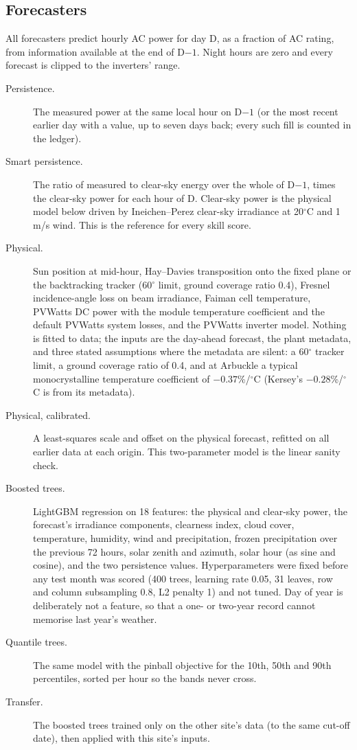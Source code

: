 \documentclass[11pt]{article}
\begin{document}
\subsection{Forecasters}

All forecasters predict hourly AC power for day D, as a fraction of AC rating, from information available at the end of D$-1$. Night hours are zero and every forecast is clipped to the inverters' range.

\begin{description}
\item[Persistence.] The measured power at the same local hour on D$-1$ (or the most recent earlier day with a value, up to seven days back; every such fill is counted in the ledger).
\item[Smart persistence.] The ratio of measured to clear-sky energy over the whole of D$-1$, times the clear-sky power for each hour of D. Clear-sky power is the physical model below driven by Ineichen--Perez clear-sky irradiance at 20$^\circ$C and 1\,m/s wind. This is the reference for every skill score.
\item[Physical.] Sun position at mid-hour, Hay--Davies transposition onto the fixed plane or the backtracking tracker (60$^\circ$ limit, ground coverage ratio 0.4), Fresnel incidence-angle loss on beam irradiance, Faiman cell temperature, PVWatts DC power with the module temperature coefficient and the default PVWatts system losses, and the PVWatts inverter model. Nothing is fitted to data; the inputs are the day-ahead forecast, the plant metadata, and three stated assumptions where the metadata are silent: a 60$^\circ$ tracker limit, a ground coverage ratio of 0.4, and at Arbuckle a typical monocrystalline temperature coefficient of $-0.37$\%/$^\circ$C (Kersey's $-0.28$\%/$^\circ$C is from its metadata).
\item[Physical, calibrated.] A least-squares scale and offset on the physical forecast, refitted on all earlier data at each origin. This two-parameter model is the linear sanity check.
\item[Boosted trees.] LightGBM regression on 18 features: the physical and clear-sky power, the forecast's irradiance components, clearness index, cloud cover, temperature, humidity, wind and precipitation, frozen precipitation over the previous 72 hours, solar zenith and azimuth, solar hour (as sine and cosine), and the two persistence values. Hyperparameters were fixed before any test month was scored (400 trees, learning rate 0.05, 31 leaves, row and column subsampling 0.8, L2 penalty 1) and not tuned. Day of year is deliberately not a feature, so that a one- or two-year record cannot memorise last year's weather.
\item[Quantile trees.] The same model with the pinball objective for the 10th, 50th and 90th percentiles, sorted per hour so the bands never cross.
\item[Transfer.] The boosted trees trained only on the other site's data (to the same cut-off date), then applied with this site's inputs.
\end{description}
\end{document}
